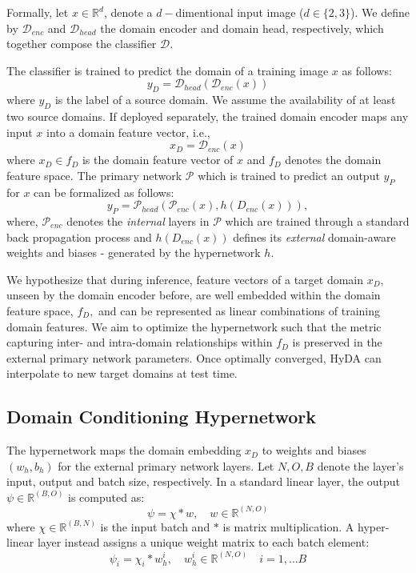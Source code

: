 \documentclass[runningheads]{llncs}
\begin{document}
Formally, let $x \in \mathbb{R}^{d}$, denote a $d-$dimentional input image ($d\in\{2,3\}$). 
We define by $\mathcal{D}_{enc}$ and $\mathcal{D}_{head}$ the domain encoder and domain head, respectively, which together compose the classifier $\mathcal{D}$. 

The classifier is trained to predict the domain of a training image $x$ as follows:
\begin{equation}
    y_D = \mathcal{D}_{head}(\mathcal{D}_{enc}(x))
\end{equation}
where $y_D$ is the label of a source domain. We assume the availability of at least two source domains. If deployed separately, the trained domain encoder maps any input $x$ into a domain feature vector, i.e.,
\begin{equation}
    x_D = \mathcal{D}_{enc}(x)
\end{equation}
where $x_D \in f_D$ is the domain feature vector of $x$ and $f_D$ denotes the domain feature space.
The primary network $\mathcal{P}$ which is trained to predict an output $y_P$ for $x$ can be formalized as follows: 
\begin{equation}
    y_P = \mathcal{P}_{head}(\mathcal{P}_{enc}(x), \mathit{h}(D_{enc}(x))), 
\end{equation}
where, $\mathcal{P}_{enc}$ denotes the \emph{internal} layers in $\mathcal{P}$ which are trained through a standard back propagation process and $\mathit{h}(D_{enc}(x))$ defines its \emph{external} domain-aware weights and biases - generated by the hypernetwork $\mathit{h}.$ 

We hypothesize that during inference, feature vectors of a target domain $x_D$, unseen by the domain encoder before, are well embedded within the domain feature space, $f_D,$ and can be represented as linear combinations of training domain features. We aim to optimize the hypernetwork such that the metric capturing inter- and intra-domain relationships within $f_D$ is preserved in the external primary network parameters. Once optimally converged, HyDA can interpolate to new target domains at test time.

\subsection{Domain Conditioning Hypernetwork}
The hypernetwork maps the domain embedding $x_D$ to weights and biases $(w_h, b_h)$
for the external primary network layers. 
Let $N,O,B$ denote the layer's input, output and batch size, respectively.  
In a standard linear layer, the output $\psi \in \mathbb{R}^{(B,O)}$ is computed as:  
\[
\psi = \chi * w, \quad w \in \mathbb{R}^{(N,O)}
\]
where \( \chi \in \mathbb{R}^{(B,N)} \) is the input batch and $*$ is matrix multiplication.  
A hyper-linear layer instead assigns a unique weight matrix to each batch element:  
\[
\psi_i = \chi_i * w_h^i, \quad w_h^i \in \mathbb{R}^{(N,O)} \quad i =1, \ldots B 
\]
\end{document}
